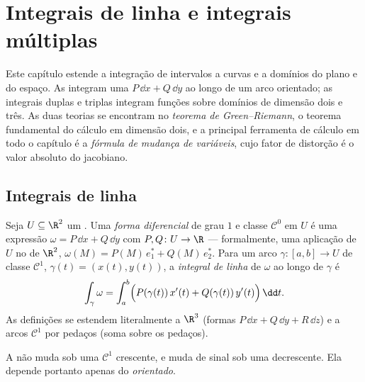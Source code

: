 \chapter{Integrais de linha e integrais múltiplas}\label{ch:b2:multint}

Este capítulo estende a integração de intervalos a curvas e a
domínios do plano e do espaço. As  integram uma
\emph{} $P\,\dd x + Q\,\dd y$ ao longo de um
arco orientado; as integrais duplas e triplas integram funções sobre
domínios de dimensão dois e três. As duas teorias se encontram no
\emph{teorema de Green--Riemann}, o teorema fundamental do cálculo
em dimensão dois, e a principal ferramenta de cálculo em todo o
capítulo é a \emph{fórmula de mudança de variáveis}, cujo fator de distorção é
o valor absoluto do  jacobiano.

\section{Integrais de linha}

\begin{definition}\label{def:b2:multint:lineint}
Seja $U \subseteq \R^2$ um . Uma \emph{forma
diferencial} de
grau $1$ e classe $\mathcal{C}^0$ em $U$ é uma expressão
$\omega = P\,\dd x + Q\,\dd y$ com $P, Q \colon U \to \R$
 --- formalmente, uma aplicação  de $U$ no 
de $\R^2$, $\omega(M) = P(M)\,e_1^* + Q(M)\,e_2^*$. Para um
arco $\gamma \colon [a, b] \to U$ de classe $\mathcal{C}^1$, $\gamma(t) =
(x(t), y(t))$, a \emph{integral de linha} de
$\omega$ ao longo de $\gamma$
é
\[
\int_\gamma \omega
= \int_a^b \Bigl(P(\gamma(t))\,x'(t)
+ Q(\gamma(t))\,y'(t)\Bigr)\,\dd t .
\]
As definições se estendem literalmente a $\R^3$ (formas $P\,\dd x +
Q\,\dd y + R\,\dd z$) e a arcos $\mathcal{C}^1$ por pedaços (soma
sobre os pedaços).
\end{definition}

\begin{proposition}\label{prop:b2:multint:lineinv}
A  não muda sob uma 
$\mathcal{C}^1$ crescente, e muda de sinal sob uma decrescente. Ela
depende portanto apenas do  \emph{orientado}.
\end{proposition}


